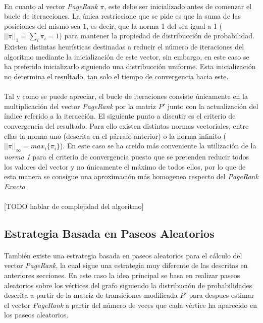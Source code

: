\documentclass{subfiles}
\begin{document}
        \paragraph{}
        En cuanto al vector \emph{PageRank} $\pi$, este debe ser inicializado antes de comenzar el bucle de iteracciones. La única restriccione que se pide es que la suma de las posiciones del mismo sea $1$, es decir, que la norma 1 del sea igual a 1 ($||\pi||_1 = \sum_i \pi_i = 1$) para mantener la propiedad de distribucción de probabilidad. Existen distintas heurísticas destinadas a reducir el número de iteraciones del algoritmo mediante la inicialización de este vector, sin embargo, en este caso se ha preferido inicializarlo siguiendo una distribucción uniforme. Esta inicialización no determina el resultado, tan solo el tiempo de convergencia hacia este.

        \paragraph{}
        Tal y como se puede apreciar, el bucle de iteraciones consiste únicamente en la multiplicación del vector \emph{PageRank} por la matriz $P'$ junto con la actualización del índice referido a la iteracción. El siguiente punto a discutir es el criterio de convergencia del resultado. Para ello existen distintas normas vectoriales, entre ellas la norma uno (descrita en el párrafo anterior) o la norma infinito ($||\pi||_{\infty}=max_i\{\pi_i\}$). En este caso se ha creido más conveniente la utilización de la \emph{norma 1} para el criterio de convergencia puesto que se pretenden reducir todos los valores del vector y no únicamente el máximo de todos ellos, por lo que de esta manera se consigue una aproximación más homogenea respecto  del \emph{PageRank Exacto}.

        \paragraph{}
        [TODO hablar de complejidad del algoritmo]

      \subsection{Estrategia Basada en Paseos Aleatorios}
      \label{sec:pagerank_algorithm_random_walks}

        \paragraph{}
        También existe una estrategia basada en paseos aleatorios para el cálculo del vector \emph{PageRank}, la cual sigue una estrategia muy diferente de las descritas en anteriores secciones. En este caso la idea principal se basa en realizar paseos aleatorios sobre los vértices del grafo siguiendo la distribución de probabilidades descrita a partir de la matriz de transiciones modificada $P'$ para despues estimar el vector \emph{PageRank} a partir del número de veces que cada vértice ha aparecido en los paseos aleatorios.
\end{document}
